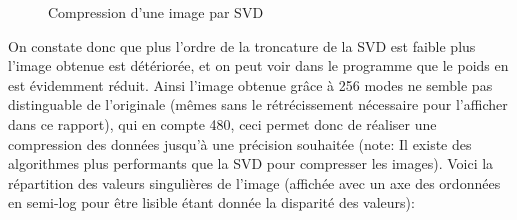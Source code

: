 \documentclass[12pt,a4paper]{report}
\begin{document}
\begin{figure}[!ht]
\hspace{1cm}
\hspace{1cm}
\caption{Compression d'une image par SVD}
\end{figure}

\clearpage

On constate donc que plus l'ordre de la troncature de la SVD est faible plus l'image obtenue est détériorée, et on peut voir dans le programme que le poids en est évidemment réduit. Ainsi l'image obtenue grâce à 256 modes ne semble pas distinguable de l'originale (mêmes sans le rétrécissement nécessaire pour l'afficher dans ce rapport), qui en compte 480, ceci permet donc de réaliser une compression des données jusqu'à une précision souhaitée
(note: Il existe des algorithmes plus performants que la SVD pour compresser les images). Voici la répartition des valeurs singulières de l'image (affichée avec un axe des ordonnées en semi-log pour être lisible étant donnée la disparité des valeurs): 
\end{document}
